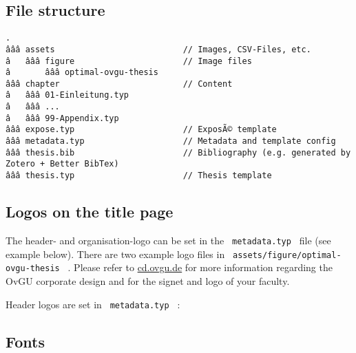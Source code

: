 \subsection{File structure}\label{file-structure}

\begin{verbatim}
.
âââ assets                          // Images, CSV-Files, etc. 
â   âââ figure                      // Image files
â       âââ optimal-ovgu-thesis    
âââ chapter                         // Content
â   âââ 01-Einleitung.typ
â   âââ ...
â   âââ 99-Appendix.typ
âââ expose.typ                      // ExposÃ© template
âââ metadata.typ                    // Metadata and template config
âââ thesis.bib                      // Bibliography (e.g. generated by Zotero + Better BibTex)
âââ thesis.typ                      // Thesis template
\end{verbatim}

\subsection{Logos on the title page}\label{logos-on-the-title-page}

The header- and organisation-logo can be set in the
\texttt{\ metadata.typ\ } file (see example below). There are two
example logo files in \texttt{\ assets/figure/optimal-ovgu-thesis\ } .
Please refer to
\href{https://www.cd.ovgu.de/Fakult\%C3\%A4ten.html}{cd.ovgu.de} for
more information regarding the OvGU corporate design and for the signet
and logo of your faculty.

Header logos are set in \texttt{\ metadata.typ\ } :

\begin{Shaded}
\begin{Highlighting}[]

\end{Highlighting}
\end{Shaded}

\subsection{Fonts}\label{fonts}

